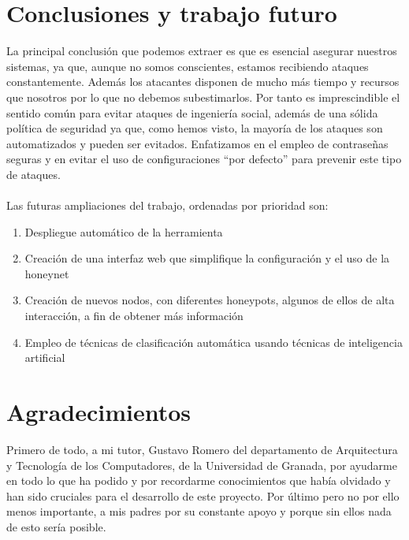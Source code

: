 \documentclass[journal]{IEEEtran}
\begin{document}
\section{Conclusiones y trabajo futuro}
La principal conclusión que podemos extraer es que es esencial asegurar nuestros sistemas, ya que, aunque no somos conscientes, estamos recibiendo ataques constantemente. Además los atacantes disponen de mucho más tiempo y recursos que nosotros por lo que no debemos subestimarlos. Por tanto es imprescindible el sentido común para evitar ataques de ingeniería social, además de una sólida política de seguridad ya que, como hemos visto, la mayoría de los ataques son automatizados y pueden ser evitados. Enfatizamos en el empleo de contraseñas seguras y en evitar el uso de configuraciones “por defecto” para prevenir este tipo de ataques.
\\\\
Las futuras ampliaciones del trabajo, ordenadas por prioridad son:
\begin{enumerate}
\item Despliegue automático de la herramienta
\item Creación de una interfaz web que simplifique la configuración y el uso de la honeynet
\item Creación de nuevos nodos, con diferentes honeypots, algunos de ellos de alta interacción, a fin de obtener más información
\item Empleo de técnicas de clasificación automática usando técnicas de inteligencia artificial
\end{enumerate}
\section*{Agradecimientos}
Primero de todo, a mi tutor, Gustavo Romero del departamento de Arquitectura y  Tecnología de los Computadores, de la Universidad de Granada, por ayudarme en todo lo que ha podido y por recordarme conocimientos que había olvidado y han sido cruciales para el desarrollo de este proyecto. Por último pero no por ello menos importante, a mis padres por su constante apoyo y porque sin ellos nada de esto sería posible.
\ifCLASSOPTIONcaptionsoff
  \newpage
\fi



\end{document}
